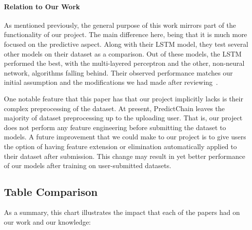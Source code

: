 \documentclass{article}
\begin{document}
    \paragraph{Relation to Our Work}

    As mentioned previously, the general purpose of this work mirrors part of the functionality of our project.
    The main difference here, being that it is much more focused on the predictive aspect.  Along with their
    LSTM model, they test several other models on their dataset as a comparison.  Out of these models,
    the LSTM performed the best, with the multi-layered perceptron and the other, non-neural network, algorithms
    falling behind.  Their observed performance matches our initial assumption and the modifications we had made
    after reviewing~\cite{recurrentModeling}.

    One notable feature that this paper has that our project implicitly lacks is their complex preprocessing of
    the dataset.  At present, PredictChain leaves the majority of dataset preprocessing up to the uploading user.
    That is, our project does not perform any feature engineering before submitting the dataset to models.  A future
    improvement that we could make to our project is to give users the option of having feature extension or elimination
    automatically applied to their dataset after submission.  This change may result in yet better performance of our
    models after training on user-submitted datasets.

    \subsection{Table Comparison}

    As a summary, this chart illustrates the impact that each of the papers had on our work and our knowledge:
\end{document}
